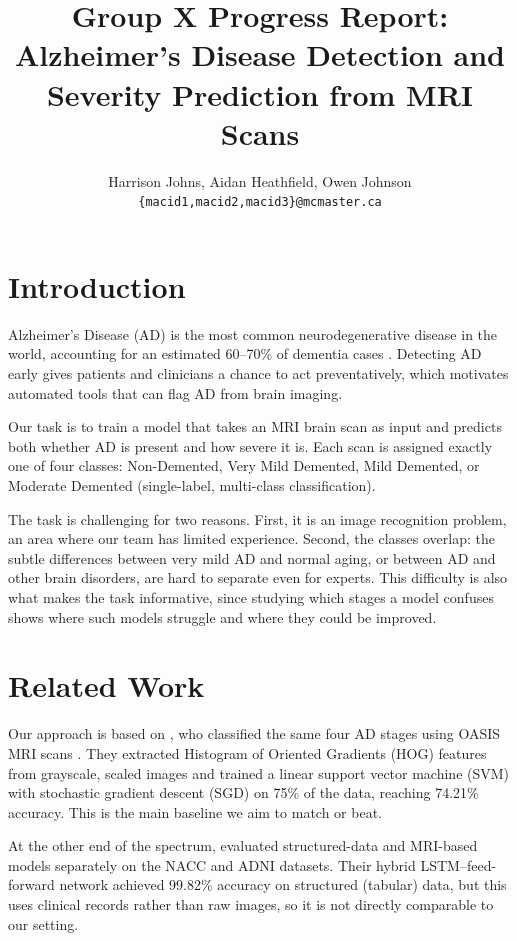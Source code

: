 \documentclass[11pt]{article}
\title{Group X Progress Report:\\Alzheimer's Disease Detection and Severity Prediction from MRI Scans}
\author{Harrison Johns, Aidan Heathfield, Owen Johnson \\
  \texttt{\{macid1,macid2,macid3\}@mcmaster.ca} }
\begin{document}
\maketitle

\section{Introduction}

Alzheimer's Disease (AD) is the most common neurodegenerative disease in the world, accounting for an estimated 60--70\% of dementia cases \citep{who_dementia}. Detecting AD early gives patients and clinicians a chance to act preventatively, which motivates automated tools that can flag AD from brain imaging.

Our task is to train a model that takes an MRI brain scan as input and predicts both whether AD is present and how severe it is. Each scan is assigned exactly one of four classes: Non-Demented, Very Mild Demented, Mild Demented, or Moderate Demented (single-label, multi-class classification).

The task is challenging for two reasons. First, it is an image recognition problem, an area where our team has limited experience. Second, the classes overlap: the subtle differences between very mild AD and normal aging, or between AD and other brain disorders, are hard to separate even for experts. This difficulty is also what makes the task informative, since studying which stages a model confuses shows where such models struggle and where they could be improved.

\section{Related Work}

Our approach is based on \citet{vengala2024}, who classified the same four AD stages using OASIS MRI scans \citep{marcus2007}. They extracted Histogram of Oriented Gradients (HOG) features from grayscale, scaled images and trained a linear support vector machine (SVM) with stochastic gradient descent (SGD) on 75\% of the data, reaching 74.21\% accuracy. This is the main baseline we aim to match or beat.

At the other end of the spectrum, \citet{mmadumbu2025} evaluated structured-data and MRI-based models separately on the NACC and ADNI datasets. Their hybrid LSTM--feed-forward network achieved 99.82\% accuracy on structured (tabular) data, but this uses clinical records rather than raw images, so it is not directly comparable to our setting.
\end{document}
